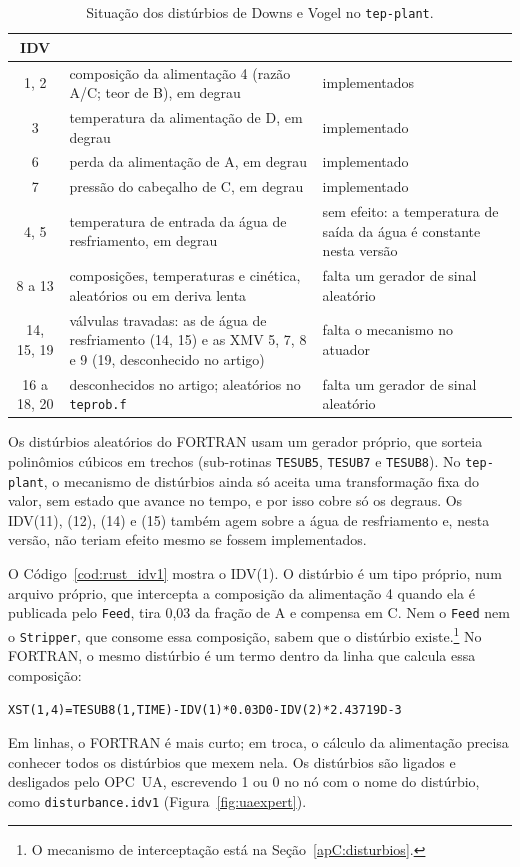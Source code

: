 \begin{table}[htbp]
	\centering
	\caption{Situação dos distúrbios de Downs e Vogel no \texttt{tep-plant}.}
	\label{tab:idvs}
	\footnotesize
	\begin{tabular}{c>{\raggedright\arraybackslash}p{}>{\raggedright\arraybackslash}p{}}
		\hline
		\multicolumn{1}{c|}{\textbf{IDV}} & \multicolumn{1}{c|}{\textbf{O que muda}} & \multicolumn{1}{c}{\textbf{Situação}} \\
		\hline
		1, 2 & composição da alimentação 4 (razão A/C; teor de B), em degrau & implementados \\
		3 & temperatura da alimentação de D, em degrau & implementado \\
		6 & perda da alimentação de A, em degrau & implementado \\
		7 & pressão do cabeçalho de C, em degrau & implementado \\
		4, 5 & temperatura de entrada da água de resfriamento, em degrau & sem efeito: a temperatura de saída da água é constante nesta versão \\
		8 a 13 & composições, temperaturas e cinética, aleatórios ou em deriva lenta & falta um gerador de sinal aleatório \\
		14, 15, 19 & válvulas travadas: as de água de resfriamento (14, 15) e as XMV 5, 7, 8 e 9 (19, desconhecido no artigo) & falta o mecanismo no atuador \\
		16 a 18, 20 & desconhecidos no artigo; aleatórios no \texttt{teprob.f} & falta um gerador de sinal aleatório \\
		\hline
	\end{tabular}
\end{table}

Os distúrbios aleatórios do FORTRAN usam um gerador próprio, que sorteia polinômios cúbicos em trechos (sub-rotinas \texttt{TESUB5}, \texttt{TESUB7} e \texttt{TESUB8}). No \texttt{tep-plant}, o mecanismo de distúrbios ainda só aceita uma transformação fixa do valor, sem estado que avance no tempo, e por isso cobre só os degraus. Os IDV(11), (12), (14) e (15) também agem sobre a água de resfriamento e, nesta versão, não teriam efeito mesmo se fossem implementados.

O Código~\ref{cod:rust_idv1} mostra o IDV(1). O distúrbio é um tipo próprio, num arquivo próprio, que intercepta a composição da alimentação 4 quando ela é publicada pelo \texttt{Feed}, tira 0,03 da fração de A e compensa em C. Nem o \texttt{Feed} nem o \texttt{Stripper}, que consome essa composição, sabem que o distúrbio existe.\footnote{O mecanismo de interceptação está na Seção~\ref{apC:disturbios}.} No FORTRAN, o mesmo distúrbio é um termo dentro da linha que calcula essa composição:
\begin{center}
	\texttt{XST(1,4)=TESUB8(1,TIME)-IDV(1)*0.03D0-IDV(2)*2.43719D-3}
\end{center}
Em linhas, o FORTRAN é mais curto; em troca, o cálculo da alimentação precisa conhecer todos os distúrbios que mexem nela. Os distúrbios são ligados e desligados pelo OPC~UA, escrevendo 1 ou 0 no nó com o nome do distúrbio, como \texttt{disturbance.idv1} (Figura~\ref{fig:uaexpert}).

